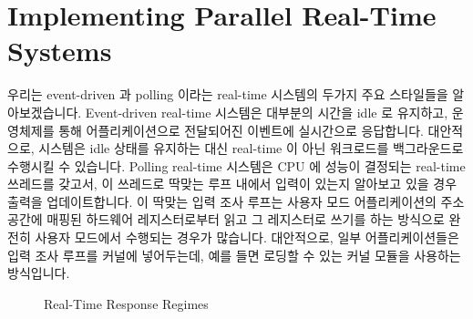 \section{Implementing Parallel Real-Time Systems}
\label{sec:rt:Implementing Parallel Real-Time Systems}

우리는 event-driven 과 polling 이라는 real-time 시스템의 두가지 주요 스타일들을
알아보겠습니다.
Event-driven real-time 시스템은 대부분의 시간을 idle 로 유지하고, 운영체제를
통해 어플리케이션으로 전달되어진 이벤트에 실시간으로 응답합니다.
대안적으로, 시스템은 idle 상태를 유지하는 대신 real-time 이 아닌 워크로드를
백그라운드로 수행시킬 수 있습니다.
Polling real-time 시스템은 CPU 에 성능이 결정되는 real-time 쓰레드를 갖고서, 이
쓰레드로 딱맞는 루프 내에서 입력이 있는지 알아보고 있을 경우 출력을
업데이트합니다.
이 딱맞는 입력 조사 루프는 사용자 모드 어플리케이션의 주소 공간에 매핑된
하드웨어 레지스터로부터 읽고 그 레지스터로 쓰기를 하는 방식으로 완전히 사용자
모드에서 수행되는 경우가 많습니다.
대안적으로, 일부 어플리케이션들은 입력 조사 루프를 커널에 넣어두는데, 예를 들면
로딩할 수 있는 커널 모듈을 사용하는 방식입니다.

\begin{figure}[tb]
\centering
{}
\caption{Real-Time Response Regimes}
\label{fig:rt:Real-Time Response Regimes}
\end{figure}

